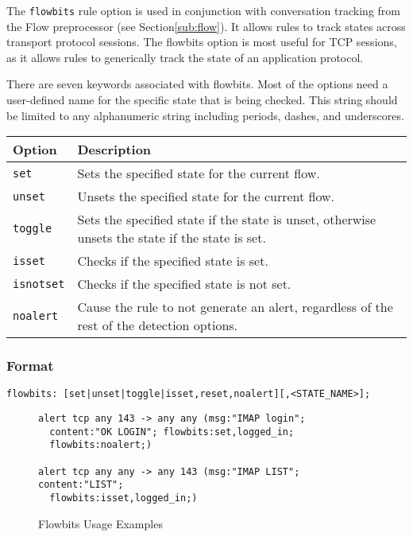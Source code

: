 \documentclass[english]{report}
\begin{document}
The \texttt{flowbits} rule option is used in conjunction with conversation
tracking from the Flow preprocessor (see Section\ref{sub:flow}).  It allows
rules to track states across transport protocol sessions.  The flowbits option
is most useful for TCP sessions, as it allows rules to generically track the
state of an application protocol.

There are seven keywords associated with flowbits. Most of the options need a
user-defined name for the specific state that is being checked.  This string
should be limited to any alphanumeric string including periods, dashes, and
underscores.

\begin{tabular}{| l | p{5in} |}
\hline
{\bf Option} & {\bf Description}\\
\hline
\hline
\texttt{set} & Sets the specified state for the current flow.\\
\hline
\texttt{unset} & Unsets the specified state for the current flow.\\
\hline
\texttt{toggle} & Sets the specified state if the state is unset, otherwise unsets the 
state if the state is set.\\
\hline
\texttt{isset} & Checks if the specified state is set.\\
\hline
\texttt{isnotset} & Checks if the specified state is not set.\\
\hline
\texttt{noalert} & Cause the rule to not generate an alert, regardless of the rest of the detection options.\\
\hline
\end{tabular}

\subsubsection{Format}

\begin{verbatim}
flowbits: [set|unset|toggle|isset,reset,noalert][,<STATE_NAME>];
\end{verbatim}




\begin{figure}[!hbpt]
\begin{verbatim}
alert tcp any 143 -> any any (msg:"IMAP login"; 
  content:"OK LOGIN"; flowbits:set,logged_in; 
  flowbits:noalert;)
  
alert tcp any any -> any 143 (msg:"IMAP LIST"; content:"LIST"; 
  flowbits:isset,logged_in;)
\end{verbatim}

\caption{Flowbits Usage Examples\label{flowbits usage examples}}
\end{figure}
\end{document}
